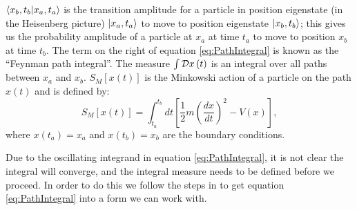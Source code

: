 \documentclass[12pt]{article}
\begin{document}
$\braket{x_b,t_b|x_a,t_a}$ is the transition amplitude for a particle in position eigenstate (in the Heisenberg picture) $\ket{x_a,t_a}$ to move to position eigenstate $\ket{x_b,t_b}$; this gives us the probability amplitude of a particle at $x_a$ at time $t_a$ to move to position $x_b$ at time $t_b$. The term on the right of equation \ref{eq:PathIntegral} is known as the ``Feynman path integral''. The measure $\int {\cal D} x\left(t\right)$ is an integral over all paths between $x_a$ and $x_b$. $S_M\left[x\left(t\right)\right]$ is the Minkowski action of a particle on the path $x\left(t\right)$ and is defined by:
\begin{equation}
	\label{eq:MinkowskiAction}
	S_M\left[x\left(t\right)\right] = \int_{t_a}^{t_b} dt \left[\frac{1}{2}m\left(\frac{dx}{dt}\right)^2 - V(x)\right],
\end{equation}
where $x\left(t_a\right) = x_a$ and $x\left(t_b\right) = x_b$ are the boundary conditions.

Due to the oscillating integrand in equation \ref{eq:PathIntegral}, it is not clear the integral will converge, and the integral measure needs to be defined before we proceed. In order to do this we follow the steps in \cite{creutz_freedman_1981} to get equation \ref{eq:PathIntegral} into a form we can work with. 
\end{document}
